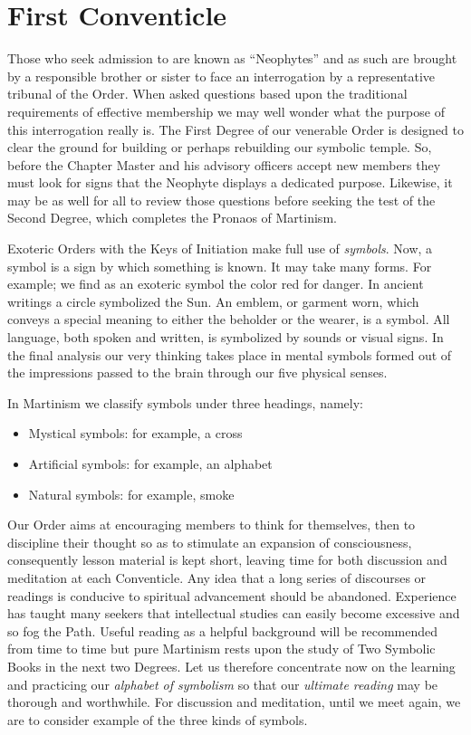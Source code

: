 \chapter{First Conventicle}

Those who seek admission to \mouplong{} are known as ``Neophytes'' and as such are brought by a responsible brother or sister to face an interrogation by a representative tribunal of the Order. When asked questions based upon the traditional requirements of effective membership we may well wonder what the purpose of this interrogation really is. The First Degree of our venerable Order is designed to clear the ground for building or perhaps rebuilding our symbolic temple. So, before the Chapter Master and his advisory officers accept new members they must look for signs that the Neophyte displays a dedicated purpose. Likewise, it may be as well for all to review those questions before seeking the test of the Second Degree, which completes the Pronaos of Martinism. 

Exoteric Orders with the Keys of Initiation make full use of \textit{symbols}. Now, a symbol is a sign by which
something is known. It may take many forms. For example; we find as an exoteric symbol the color
red for danger. In ancient writings a circle symbolized the Sun. An emblem, or garment worn, which
conveys a special meaning to either the beholder or the wearer, is a symbol. All language, both spoken
and written, is symbolized by sounds or visual signs. In the final analysis our very thinking takes place
in mental symbols formed out of the impressions passed to the brain through our five physical senses. 

In Martinism we classify symbols under three headings, namely: 

\begin{itemize}
    \item Mystical symbols: for example, a cross
    \item Artificial symbols: for example, an alphabet
    \item Natural symbols: for example, smoke
\end{itemize}

Our Order aims at encouraging members to think for themselves, then to discipline their thought so as
to stimulate an expansion of consciousness, consequently lesson material is kept short, leaving time for
both discussion and meditation at each Conventicle. Any idea that a long series of discourses or
readings is conducive to spiritual advancement should be abandoned. Experience has taught many
seekers that intellectual studies can easily become excessive and so fog the Path. Useful reading as a
helpful background will be recommended from time to time but pure Martinism rests upon the study
of Two Symbolic Books in the next two Degrees. Let us therefore concentrate now on the learning and
practicing our \textit{alphabet of symbolism} so that our \textit{ultimate reading} may be thorough and worthwhile.
For discussion and meditation, until we meet again, we are to consider example of the three kinds of
symbols. 

